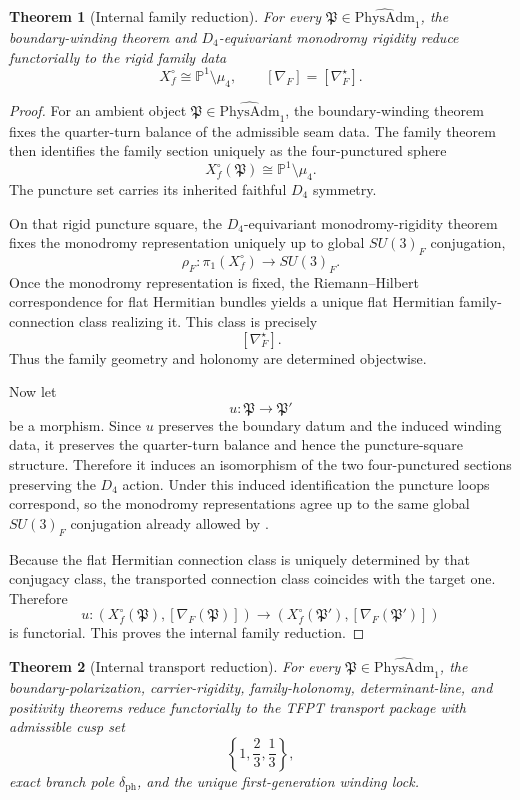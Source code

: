 \documentclass[11pt,a4paper]{article}
\newtheorem{theorem}{Theorem}[section]
\theoremstyle{definition}
\theoremstyle{remark}
\newcommand{\PhysAdmOne}{\widehat{\mathrm{PhysAdm}}_1}
\begin{document}
\begin{theorem}[Internal family reduction]
\label{prop:universal-family-reduction}
For every $\mathfrak P\in\PhysAdmOne$, the boundary-winding theorem and $D_4$-equivariant
monodromy rigidity reduce functorially to
the rigid family data
\[
X_f^\circ\cong \mathbb P^1\setminus\mu_4,
\qquad
[\nabla_F]=[\nabla_F^\star].
\]
\end{theorem}

\begin{proof}
For an ambient object $\mathfrak P\in\PhysAdmOne$, the boundary-winding theorem fixes the
quarter-turn balance of the admissible seam data. The family theorem then identifies the family
section uniquely as the four-punctured sphere
\[
X_f^\circ(\mathfrak P)\cong \mathbb P^1\setminus\mu_4.
\]
The puncture set carries its inherited faithful $D_4$ symmetry.

On that rigid puncture square, the $D_4$-equivariant monodromy-rigidity theorem fixes the
monodromy representation uniquely up to global $SU(3)_F$ conjugation,
\[
\rho_F:\pi_1(X_f^\circ)\to SU(3)_F.
\]
Once the monodromy representation is fixed, the Riemann--Hilbert correspondence for flat Hermitian
bundles yields a unique flat Hermitian family-connection class realizing it. This class is
precisely
\[
[\nabla_F^\star].
\]
Thus the family geometry and holonomy are determined objectwise.

Now let
\[
u:\mathfrak P\to \mathfrak P'
\]
be a morphism. Since $u$ preserves the boundary datum and the induced winding data, it preserves the
quarter-turn balance and hence the puncture-square structure. Therefore it induces an isomorphism
of the two four-punctured sections preserving the $D_4$ action. Under this induced identification
the puncture loops correspond, so the monodromy representations agree up to the same global
$SU(3)_F$ conjugation already allowed by .

Because the flat Hermitian connection class is uniquely determined by that conjugacy class, the
transported connection class coincides with the target one. Therefore
\[
u:(X_f^\circ(\mathfrak P),[\nabla_F(\mathfrak P)])
\longrightarrow
(X_f^\circ(\mathfrak P'),[\nabla_F(\mathfrak P')])
\]
is functorial. This proves the internal family reduction.
\end{proof}

\begin{theorem}[Internal transport reduction]
\label{prop:universal-transport-reduction}
For every $\mathfrak P\in\PhysAdmOne$, the boundary-polarization, carrier-rigidity,
family-holonomy, determinant-line, and positivity theorems reduce functorially to
the TFPT transport package with admissible cusp set
\[
\left\{1,\frac23,\frac13\right\},
\]
exact branch pole $\delta_{\mathrm{ph}}$, and the unique first-generation winding lock.
\end{theorem}
\end{document}
